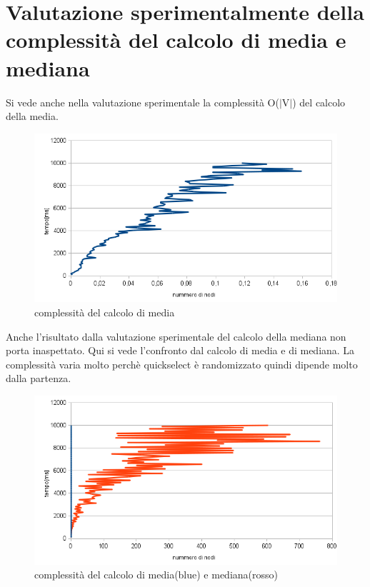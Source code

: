 \documentclass[11pt, a4paper, titlepage, block]{article}
\begin{document}
\section{Valutazione sperimentalmente della complessit\`{a} del calcolo di media e mediana}
Si vede anche nella valutazione sperimentale la complessit\`{a} O($|$V$|$) del calcolo della media.
\begin{figure}[htp]
\centering
\includegraphics[scale=0.80]{img/calcolo_media.png}
\caption{complessit\`{a} del calcolo di media}
\end{figure}
\newpage
Anche l'risultato dalla valutazione sperimentale del calcolo della mediana non porta inaspettato. Qui si vede l'confronto dal calcolo di media e di mediana. La complessit\`{a} varia molto perch\`{e} quickselect \`{e} randomizzato quindi dipende molto dalla partenza.
\begin{figure}[htp]
\centering
\includegraphics[scale=0.80]{img/calcolo_mediana.png}
\caption{complessit\`{a} del calcolo di media(blue) e mediana(rosso)}
\end{figure}
\end{document}
